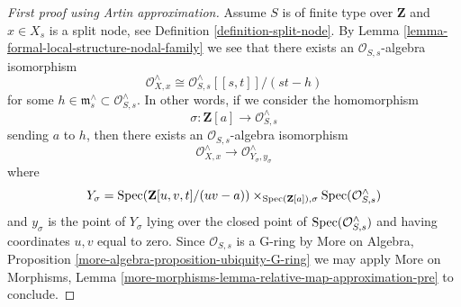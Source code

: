 \begin{proof}[First proof using Artin approximation]
\medskip\noindent
Assume $S$ is of finite type over $\mathbf{Z}$ and
$x \in X_s$ is a split node, see Definition \ref{definition-split-node}.
By Lemma \ref{lemma-formal-local-structure-nodal-family} we see that there
exists an $\mathcal{O}_{S, s}$-algebra isomorphism
$$
\mathcal{O}_{X, x}^\wedge \cong
\mathcal{O}_{S, s}^\wedge[[s, t]]/(st - h)
$$
for some $h \in \mathfrak m_s^\wedge \subset \mathcal{O}_{S, s}^\wedge$.
In other words, if we consider the homomorphism
$$
\sigma : \mathbf{Z}[a] \longrightarrow \mathcal{O}_{S, s}^\wedge
$$
sending $a$ to $h$, then there exists an $\mathcal{O}_{S, s}$-algebra
isomorphism
$$
\mathcal{O}_{X, x}^\wedge
\longrightarrow
\mathcal{O}_{Y_\sigma, y_\sigma}^\wedge
$$
where
$$
Y_\sigma = \mathop{\mathrm{Spec}}(\mathbf{Z}[u, v, t]/(uv - a))
\times_{\mathop{\mathrm{Spec}}(\mathbf{Z}[a]), \sigma} \mathop{\mathrm{Spec}}(\mathcal{O}_{S, s}^\wedge)
$$
and $y_\sigma$ is the point of $Y_\sigma$ lying over
the closed point of $\mathop{\mathrm{Spec}}(\mathcal{O}_{S, s}^\wedge)$
and having coordinates $u, v$ equal to zero. Since
$\mathcal{O}_{S, s}$ is a G-ring by
More on Algebra, Proposition \ref{more-algebra-proposition-ubiquity-G-ring}
we may apply More on Morphisms, Lemma
\ref{more-morphisms-lemma-relative-map-approximation-pre}
to conclude.
\end{proof}

